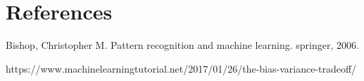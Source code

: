 \documentclass[5p,sort&compress]{elsarticle}
\begin{document}
\section*{References}


\begin{thebibliography}{9}

Bishop, Christopher M. Pattern recognition and machine learning. springer, 2006.

https://www.machinelearningtutorial.net/2017/01/26/the-bias-variance-tradeoff/

\end{thebibliography}
\end{document}
